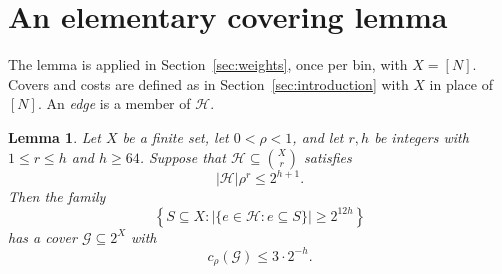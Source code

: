 \documentclass[11pt,letterpaper]{article}
\newtheorem{lemma}[theorem]{Lemma}
\theoremstyle{definition}
\theoremstyle{remark}
\numberwithin{equation}{section}
\begin{document}
\section{An elementary covering lemma}
\label{sec:covering}

The lemma is applied in Section~\ref{sec:weights}, once per bin, with
$X=[N]$. Covers and costs are defined as in
Section~\ref{sec:introduction} with $X$ in place of $[N]$. An
\emph{edge} is a member of $\mathcal H$.

\begin{lemma}\label{lem:covering}
Let \(X\) be a finite set, let \(0<\rho<1\), and let \(r,h\) be integers
with \(1\le r\le h\) and \(h\ge64\). Suppose that
\(\mathcal H\subseteq\binom{X}{r}\) satisfies
\[
|\mathcal H|\rho^r\le2^{h+1}.
\]
Then the family
\[
\left\{S\subseteq X:
  |\{e\in\mathcal H:e\subseteq S\}|\ge2^{12h}\right\}
\]
has a cover \(\mathcal G\subseteq2^X\) with
\[
c_\rho(\mathcal G)\le3\cdot2^{-h}.
\]
\end{lemma}
\end{document}
